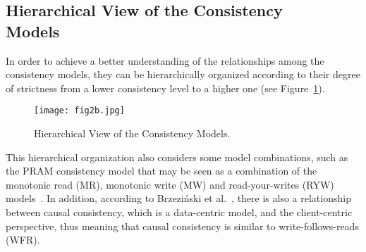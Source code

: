 \subsection{Hierarchical View of the Consistency \\ Models}
In order to achieve a better understanding of the relationships among the consistency models, they can be hierarchically organized according to their degree of strictness from a lower consistency level to a higher one (see Figure~\ref{fig:hierarchicalView}).  

\begin{figure}[h]
\centering	\texttt{[image: fig2b.jpg]}

\vspace{-3mm}
\caption{Hierarchical View of the Consistency Models.}
\label{fig:hierarchicalView}
\end{figure}

This hierarchical organization also considers some model combinations, such as the PRAM consistency model that may be seen as a combination of the monotonic read (MR), monotonic write (MW) and read-your-writes (RYW) models~\cite{bailis2013highly}. In addition, according to Brzezi\'nski et al.~\cite{brzezinski2004session}, there is also a relationship between causal consistency, which is a data-centric model, and the client-centric perspective,  
thus meaning that causal consistency is similar to write-follows-reads (WFR). 
\\

\begin{comment}

\begin{figure}[h]
\centering
\begin{minipage}{18cm}
\texttt{[image: fig2b.jpg]}
\label{fig:fig2b}
\end{minipage}
\caption{Hierarchy of the Consistency Models}
\end{figure}
\end{comment}